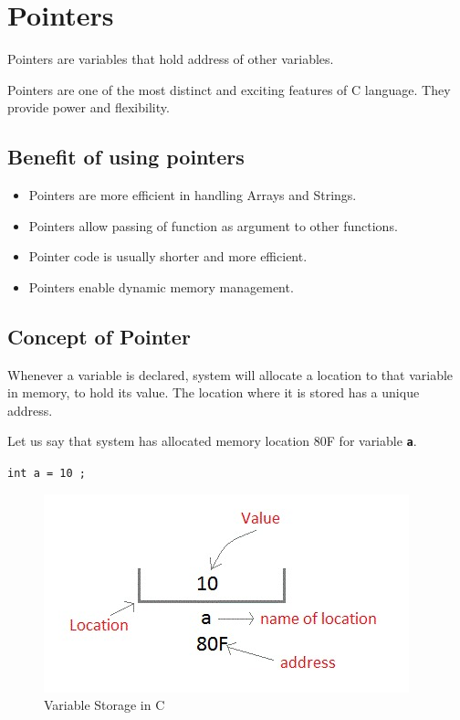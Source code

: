 \documentclass[11pt,a4paper]{article}
\author{TalentSprint}
\date{}
\begin{document}
\section*{Pointers}
Pointers are variables that hold address of other variables.

Pointers are one of the most distinct and exciting features of C language. They provide power and flexibility.

\subsection*{Benefit of using pointers}
\begin{itemize}
\item Pointers are more efficient in handling Arrays and Strings.
\item Pointers allow passing of function as argument to other functions.
\item Pointer code is usually shorter and more efficient.
\item Pointers enable dynamic memory management.
\end{itemize}

\subsection*{Concept of Pointer}
Whenever a variable is declared, system will allocate a location to that variable in memory, to hold its value. The location where it is stored has a unique address.

Let us say that system has allocated memory location 80F for variable \textbf{\texttt{a}}.

\lstinline!int a = 10 ;!

\begin{figure}[ht]

\begin{center}
\includegraphics[scale=0.6]{variable_storage_in_c.jpg}
\caption{Variable Storage in C}
\label{var:storage}
\end{center}
\end{figure}
\end{document}
